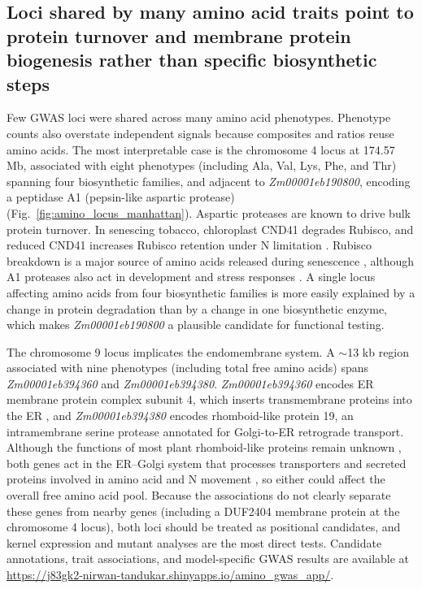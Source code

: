 \subsection{Loci shared by many amino acid traits point to protein turnover and membrane protein biogenesis rather than specific biosynthetic steps}

Few GWAS loci were shared across many amino acid phenotypes. Phenotype counts also overstate independent signals because composites and ratios reuse amino acids. The most interpretable case is the chromosome 4 locus at 174.57 Mb, associated with eight phenotypes (including Ala, Val, Lys, Phe, and Thr) spanning four biosynthetic families, and adjacent to \textit{Zm00001eb190800}, encoding a peptidase A1 (pepsin-like aspartic protease) (Fig.~\ref{fig:amino_locus_manhattan}). Aspartic proteases are known to drive bulk protein turnover. In senescing tobacco, chloroplast CND41 degrades Rubisco, and reduced CND41 increases Rubisco retention under N limitation \citep{Kato2004CND41}. Rubisco breakdown is a major source of amino acids released during senescence \citep{Feller2008Rubiscolytics}, although A1 proteases also act in development and stress responses \citep{Soares2019AtypicalAP}. A single locus affecting amino acids from four biosynthetic families is more easily explained by a change in protein degradation than by a change in one biosynthetic enzyme, which makes \textit{Zm00001eb190800} a plausible candidate for functional testing.

The chromosome 9 locus implicates the endomembrane system. A $\sim$13 kb region associated with nine phenotypes (including total free amino acids) spans \textit{Zm00001eb394360} and \textit{Zm00001eb394380}. \textit{Zm00001eb394360} encodes ER membrane protein complex subunit 4, which inserts transmembrane proteins into the ER \citep{Guna2018EMC}, and \textit{Zm00001eb394380} encodes rhomboid-like protein 19, an intramembrane serine protease annotated for Golgi-to-ER retrograde transport. Although the functions of most plant rhomboid-like proteins remain unknown \citep{Lavell2021RBL10}, both genes act in the ER--Golgi system that processes transporters and secreted proteins involved in amino acid and N movement \citep{Brandizzi2018ERGolgi}, so either could affect the overall free amino acid pool. Because the associations do not clearly separate these genes from nearby genes (including a DUF2404 membrane protein at the chromosome 4 locus), both loci should be treated as positional candidates, and kernel expression and mutant analyses are the most direct tests. Candidate annotations, trait associations, and model-specific GWAS results are available at \url{https://j83gk2-nirwan-tandukar.shinyapps.io/amino_gwas_app/}.

